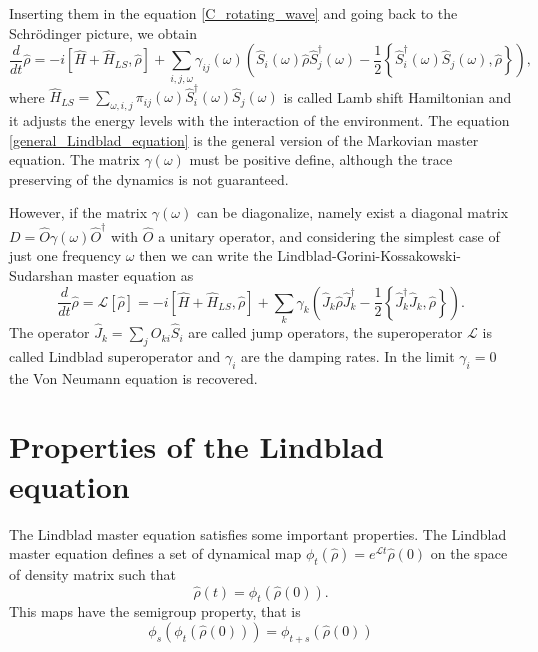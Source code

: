 Inserting them in the equation \eqref{C_rotating_wave} and going back to the Schrödinger picture, we obtain
\begin{equation}\label{general_Lindblad_equation}
    \frac{d}{dt}\hat\rho = -i\left[\hat H + \hat H_{LS},\hat\rho\right] + \sum_{i,j,\omega} \gamma_{ij}(\omega) \left(\hat S_i(\omega) \hat\rho \hat S^\dagger_j(\omega) - \frac{1}{2}\left\{ \hat S^\dagger_i(\omega)\hat S_j(\omega), \hat\rho\right\} \right),
\end{equation}
where $\hat H_{LS} = \sum_{\omega,i,j} \pi_{ij}(\omega)\hat S^\dagger_i(\omega)\hat S_j(\omega)$ is called Lamb shift Hamiltonian and it adjusts the energy levels with the interaction of the environment. The equation \eqref{general_Lindblad_equation} is the general version of the Markovian master equation. The matrix $\gamma(\omega)$ must be positive define, although the trace preserving of the dynamics is not guaranteed.

However, if the matrix $\gamma(\omega)$ can be diagonalize, namely exist a diagonal matrix $D=\hat O \gamma(\omega) \hat O^\dagger$ with $\hat O$ a unitary operator, and considering the simplest case of just one frequency $\omega$ then we can write the Lindblad-Gorini-Kossakowski-Sudarshan master equation as
\begin{equation}\label{Lindbladian}
    \frac{d}{dt}\hat\rho =\mathcal{L}\left[\hat\rho\right] = -i\left[\hat H+\hat H_{LS},\hat\rho\right] + \sum_k \gamma_k \left(\hat J_k \hat\rho \hat J^\dagger_k - \frac{1}{2}\left\{ \hat J^\dagger_k\hat J_k, \hat\rho\right\} \right).
\end{equation}
The operator $\hat J_k= \sum_j O_{ki} \hat S_{i}$ are called jump operators, the superoperator $\mathcal{L}$ is called Lindblad superoperator and $\gamma_i$ are the damping rates. In the limit $\gamma_i = 0$ the Von Neumann equation is recovered.



\section{Properties of the Lindblad equation}
The Lindblad master equation satisfies some important properties.
The Lindblad master equation defines a set of dynamical map $\phi_t\left(\hat\rho\right)= e^{\mathcal{L}t}\hat\rho(0)$ on the space of density matrix such that
\begin{equation}
    \hat\rho(t) = \phi_t\left(\hat\rho(0)\right).
\end{equation}
This maps have the semigroup property, that is
\begin{equation}
    \phi_s\left(\phi_t\left(\hat\rho(0)\right)\right)=\phi_{t+s}\left(\hat\rho(0)\right)
\end{equation}

